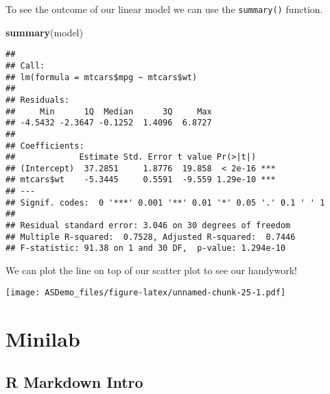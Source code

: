 \documentclass[]{book}
\newenvironment{Shaded}{\begin{snugshade}}{\end{snugshade}}
\newcommand{\KeywordTok}[1]{\textcolor[rgb]{0.13,0.29,0.53}{\textbf{#1}}}
\newcommand{\StringTok}[1]{\textcolor[rgb]{0.31,0.60,0.02}{#1}}
\newcommand{\OperatorTok}[1]{\textcolor[rgb]{0.81,0.36,0.00}{\textbf{#1}}}
\newcommand{\NormalTok}[1]{#1}
\begin{document}
\begin{Shaded}
\end{Shaded}

To see the outcome of our linear model we can use the \texttt{summary()}
function.

\begin{Shaded}
\begin{Highlighting}[]
\KeywordTok{summary}\NormalTok{(model)}
\end{Highlighting}
\end{Shaded}

\begin{verbatim}
## 
## Call:
## lm(formula = mtcars$mpg ~ mtcars$wt)
## 
## Residuals:
##     Min      1Q  Median      3Q     Max 
## -4.5432 -2.3647 -0.1252  1.4096  6.8727 
## 
## Coefficients:
##             Estimate Std. Error t value Pr(>|t|)    
## (Intercept)  37.2851     1.8776  19.858  < 2e-16 ***
## mtcars$wt    -5.3445     0.5591  -9.559 1.29e-10 ***
## ---
## Signif. codes:  0 '***' 0.001 '**' 0.01 '*' 0.05 '.' 0.1 ' ' 1
## 
## Residual standard error: 3.046 on 30 degrees of freedom
## Multiple R-squared:  0.7528, Adjusted R-squared:  0.7446 
## F-statistic: 91.38 on 1 and 30 DF,  p-value: 1.294e-10
\end{verbatim}

We can plot the line on top of our scatter plot to see our handywork!

\begin{Shaded}
\end{Shaded}

\texttt{[image: ASDemo\_files/figure-latex/unnamed-chunk-25-1.pdf]}

\chapter{Minilab}\label{minilab}

\section{R Markdown Intro}\label{r-markdown-intro}
\end{document}
